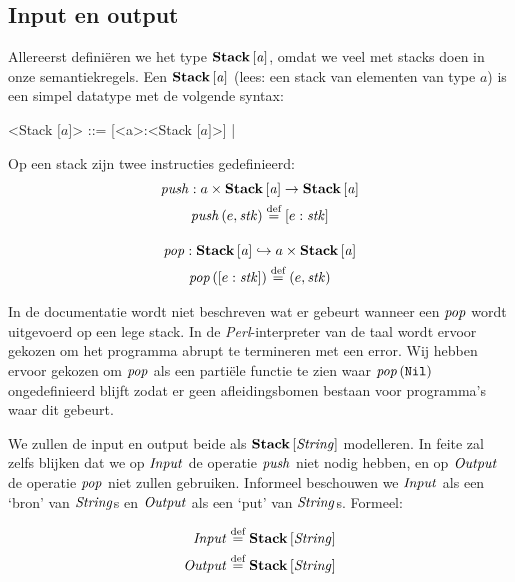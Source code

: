 \subsection{Input en output}
\label{sec:def:io}

Allereerst definiëren we het type $\mathbf{Stack}\left[\mathit{a}\right]$, omdat we veel met stacks
doen in onze semantiekregels. Een $\mathbf{Stack}\left[\mathit{a}\right]$ (lees: een stack van elementen
van type $a$) is een simpel datatype met de volgende syntax:

\def\inbrackets#1{$\mathrm{[}#1\mathrm{]}$}
\def\bracka{\inbrackets{a}}
\begin{grammar}
	<Stack \bracka> ::= [<a>:<Stack \bracka>] | \Nil
\end{grammar}

Op een stack zijn twee instructies gedefinieerd:
\begin{gather*}
	\mathit{push} : a \times \mathbf{Stack}\left[\mathit{a}\right] \to \mathbf{Stack}\left[\mathit{a}\right] \\
	\mathit{push}\left(e, \mathit{stk}\right) \stackrel{\text{def}}{=} [e:\mathit{stk}] \\[1em]
	\mathit{pop} : \mathbf{Stack}\left[\mathit{a}\right] \hookrightarrow a \times \mathbf{Stack}\left[\mathit{a}\right] \\
	\mathit{pop}\left([e:\mathit{stk}]\right) \stackrel{\text{def}}{=} (e,\mathit{stk}) \\
\end{gather*}

In de documentatie \cite{safalra} wordt niet beschreven wat er gebeurt wanneer
een $\mathit{pop}$ wordt uitgevoerd op een lege stack. In de
\emph{Perl}-interpreter van de taal wordt ervoor gekozen om het programma
abrupt te termineren met een error. Wij hebben ervoor gekozen om $\mathit{pop}$ als
een partiële functie te zien waar $\mathit{pop}\left(\texttt{Nil}\right)$ ongedefinieerd blijft zodat er
geen afleidingsbomen bestaan voor programma's waar dit gebeurt.

\medskip
We zullen de input en output beide als $\mathbf{Stack}\left[\mathit{\mathit{String}}\right]$ modelleren. In feite
zal zelfs blijken dat we op $\mathit{Input}$ de operatie $\mathit{push}$ niet nodig hebben,
en op $\mathit{Output}$ de operatie $\mathit{pop}$ niet zullen gebruiken. Informeel
beschouwen we $\mathit{Input}$ als een `bron' van $\mathit{String}$s en $\mathit{Output}$ als een `put'
van $\mathit{String}$s. Formeel:

\begin{align*}
	\mathit{Input} &\stackrel{\text{def}}{=} \mathbf{Stack}\left[\mathit{\mathit{String}}\right] \\ \mathit{Output} &\stackrel{\text{def}}{=} \mathbf{Stack}\left[\mathit{\mathit{String}}\right]
\end{align*}
